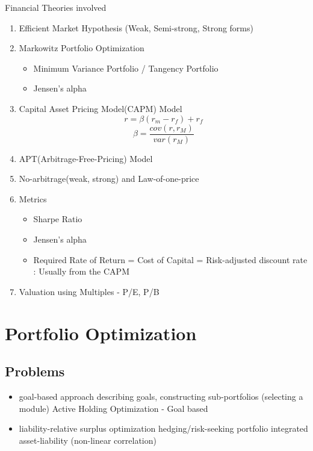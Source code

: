 \documentclass[11pt, openany]{book}              %
\begin{document}
Financial Theories involved

\begin{enumerate}
 \item Efficient Market Hypothesis (Weak, Semi-strong, Strong forms)
 \item Markowitz Portfolio Optimization
 \begin{itemize}
    \item Minimum Variance Portfolio / Tangency Portfolio 
    \item Jensen's alpha
  \end{itemize}
  \item Capital Asset Pricing Model(CAPM) Model \\
        $$ r = \beta(r_m - r_f) + r_f $$
 		$$\beta = \frac{cov(r,r_M)}{var(r_M)}$$
  \item APT(Arbitrage-Free-Pricing) Model 
 \item No-arbitrage(weak, strong) and Law-of-one-price
 \item Metrics
  \begin{itemize}
    \item Sharpe Ratio
    \item Jensen's alpha
    
        \item Required Rate of Return = Cost of Capital = Risk-adjusted discount rate : Usually from the CAPM
   \end{itemize}
 \item Valuation using Multiples - P/E, P/B 
 \end{enumerate}
 
 
\section{Portfolio Optimization}

\subsection{Problems}

\begin{itemize}
	\item goal-based approach
        \subitem describing goals, constructing sub-portfolios (selecting a module)
        \subitem Active Holding Optimization - Goal based
	 \item liability-relative
         \subitem surplus optimization
        \subitem hedging/risk-seeking portfolio
         \subitem integrated asset-liability (non-linear correlation)
\end{itemize}
\end{document}

